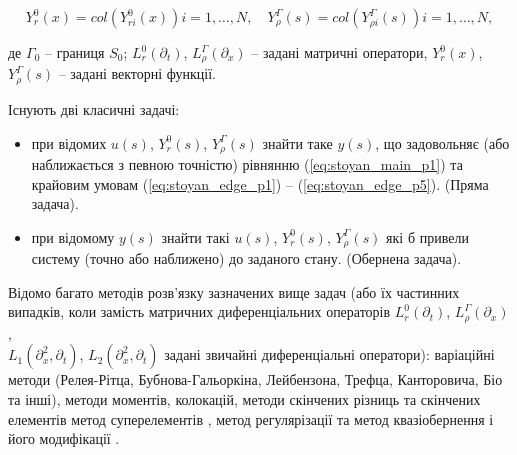 \begin{equation}
\label{eq:stoyan_edge_p5}
Y_r^0(x) = col(Y_{ri}^0(x))i=1,\ldots,N,\quad Y_{\rho}^{\Gamma}(s)=col(Y_{\rho i}^{\Gamma}(s))i=1,\ldots,N,
\end{equation}

де $\Gamma_0$ – границя $S_0$; $L_r^0(\partial_t)$, $L_{\rho}^\Gamma(\partial_x)$ – задані матричні
оператори, $Y_r^0(x)$, $Y_{\rho}^\Gamma(s)$  – задані векторні функції.

Існують дві класичні задачі:
\begin{itemize}
\item при відомих $u(s)$, $Y_r^0(s)$, $Y_{\rho}^\Gamma(s)$ знайти таке $y(s)$, що задовольняє
(або наближається з певною точністю) рівнянню (\ref{eq:stoyan_main_p1}) та крайовим
 умовам (\ref{eq:stoyan_edge_p1}) – (\ref{eq:stoyan_edge_p5}). (Пряма задача).
\item при відомому $y(s)$ знайти такі $u(s)$, $Y_r^0(s)$, $Y_{\rho}^\Gamma(s)$
які б привели систему (точно або наближено) до заданого стану. (Обернена задача).
\end{itemize}


Відомо багато методів розв’язку зазначених вище задач (або їх частинних випадків, коли замість матричних
диференціальних операторів
$L_r^0(\partial_t)$, $L_\rho^\Gamma(\partial_x)$, \\ $L_1(\partial_x^2, \partial_t)$, $L_2(\partial_x^2, \partial_t)$
задані звичайні диференціальні оператори): варіаційні методи
\cite{Ivanenko-Variatsyonnye, Kozdoba-Vychyslitelnaya, Rvachov-Metody, Elsgoltz-Differentsialnye}
 (Релея-Рітца, Бубнова-Гальоркіна, Лейбензона, Трефца, Канторовича, Біо та інші),
методи моментів, колокацій, методи скінчених різниць та скінчених елементів
\cite{Deyneka-Modeli, Segerlind-primenenie} метод суперелементів
\cite{Sergienko-Matematicheskoe}, метод регулярізації
\cite{Alifanov-ObratnieZadachiTeploobmena, Alifanov-PrimeneniePrinzipa, Alifanov-ReshenieNelineynoyObratnoy,
Tihonov-Metody, Tihonov-Nekorrektnye, Tihonov-Reguliariziruiuschie, Tihonov-Matematicheskoe, Tihonov-Chislennye}
 та метод квазіобернення і його модифікації
\cite{Lattes-MetodKvazi, Lions-NekotoryeMedody, Lions-Upravlenie, Lions-Optimalnoe}.


